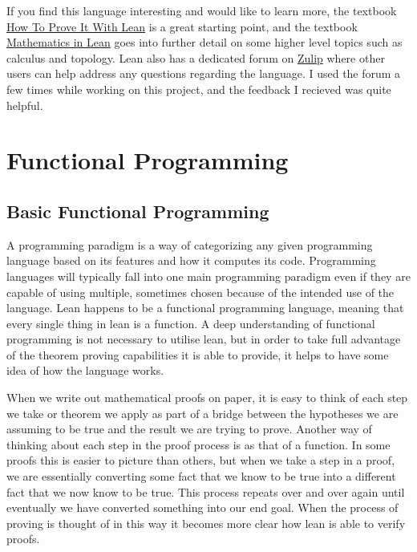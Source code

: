 \documentclass[
  letterpaper,
]{scrreprt}
\theoremstyle{remark}
\begin{document}
If you find this language interesting and would like to learn more, the
textbook \href{https://djvelleman.github.io/HTPIwL/}{How To Prove It
With Lean} is a great starting point, and the textbook
\href{https://leanprover-community.github.io/mathematics_in_lean/index.html}{Mathematics
in Lean} goes into further detail on some higher level topics such as
calculus and topology. Lean also has a dedicated forum on
\href{https://leanprover.zulipchat.com}{Zulip} where other users can
help address any questions regarding the language. I used the forum a
few times while working on this project, and the feedback I recieved was
quite helpful.


\hypertarget{functional-programming}{%
\chapter{Functional Programming}\label{functional-programming}}

\hypertarget{basic-functional-programming}{%
\section{Basic Functional
Programming}\label{basic-functional-programming}}

A programming paradigm is a way of categorizing any given programming
language based on its features and how it computes its code. Programming
languages will typically fall into one main programming paradigm even if
they are capable of using multiple, sometimes chosen because of the
intended use of the language. Lean happens to be a functional
programming language, meaning that every single thing in lean is a
function. A deep understanding of functional programming is not
necessary to utilise lean, but in order to take full advantage of the
theorem proving capabilities it is able to provide, it helps to have
some idea of how the language works.

When we write out mathematical proofs on paper, it is easy to think of
each step we take or theorem we apply as part of a bridge between the
hypotheses we are assuming to be true and the result we are trying to
prove. Another way of thinking about each step in the proof process is
as that of a function. In some proofs this is easier to picture than
others, but when we take a step in a proof, we are essentially
converting some fact that we know to be true into a different fact that
we now know to be true. This process repeats over and over again until
eventually we have converted something into our end goal. When the
process of proving is thought of in this way it becomes more clear how
lean is able to verify proofs.
\end{document}
